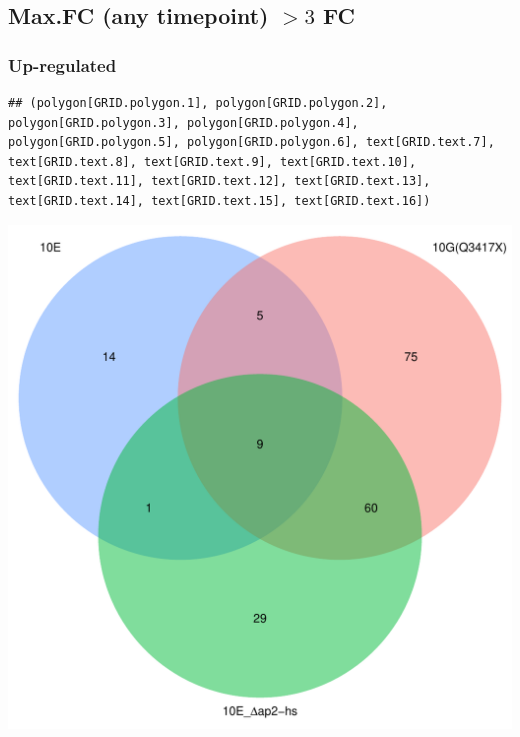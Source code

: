 \documentclass{article}\usepackage[]{graphicx}\usepackage[]{color}
\makeatletter
\newenvironment{kframe}{%
 \def\at@end@of@kframe{}%
 \ifinner\ifhmode%
  \def\at@end@of@kframe{\end{minipage}}%
  \begin{minipage}{\columnwidth}%
 \fi\fi%
 \def\FrameCommand##1{\hskip\@totalleftmargin \hskip-\fboxsep
 \colorbox{shadecolor}{##1}\hskip-\fboxsep
     \hskip-\linewidth \hskip-\@totalleftmargin \hskip\columnwidth}%
 \MakeFramed {\advance\hsize-\width
   \@totalleftmargin\z@ \linewidth\hsize
   \@setminipage}}%
 {\par\unskip\endMakeFramed%
 \at@end@of@kframe}
\newenvironment{knitrout}{}{} %
\makeatother
\begin{document}
\subsection{Max.FC (any timepoint) $>3$ FC}
\subsubsection{Up-regulated}

\begin{knitrout}
\color{fgcolor}\begin{kframe}
\begin{verbatim}
## (polygon[GRID.polygon.1], polygon[GRID.polygon.2], polygon[GRID.polygon.3], polygon[GRID.polygon.4], polygon[GRID.polygon.5], polygon[GRID.polygon.6], text[GRID.text.7], text[GRID.text.8], text[GRID.text.9], text[GRID.text.10], text[GRID.text.11], text[GRID.text.12], text[GRID.text.13], text[GRID.text.14], text[GRID.text.15], text[GRID.text.16])
\end{verbatim}
\end{kframe}

{\centering \includegraphics[width=1\linewidth,height=.4\textheight]{figure/minimal-venn_alltimes_3fc_up_venn-1} 

}



\end{knitrout}
\end{document}
